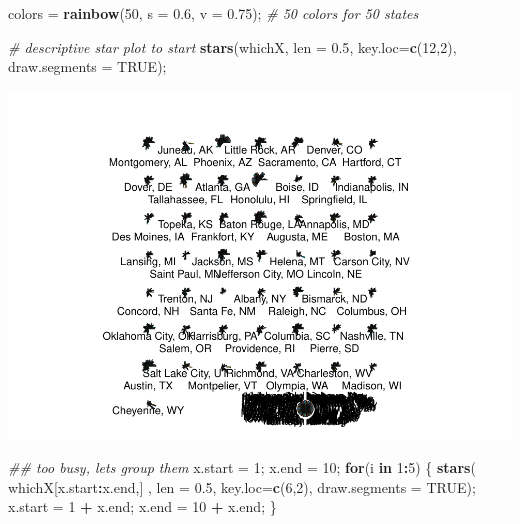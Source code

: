 \documentclass[
]{article}
\newenvironment{Shaded}{\begin{snugshade}}{\end{snugshade}}
\newcommand{\CommentTok}[1]{\textcolor[rgb]{0.56,0.35,0.01}{\textit{#1}}}
\newcommand{\ControlFlowTok}[1]{\textcolor[rgb]{0.13,0.29,0.53}{\textbf{#1}}}
\newcommand{\DataTypeTok}[1]{\textcolor[rgb]{0.13,0.29,0.53}{#1}}
\newcommand{\DecValTok}[1]{\textcolor[rgb]{0.00,0.00,0.81}{#1}}
\newcommand{\FloatTok}[1]{\textcolor[rgb]{0.00,0.00,0.81}{#1}}
\newcommand{\KeywordTok}[1]{\textcolor[rgb]{0.13,0.29,0.53}{\textbf{#1}}}
\newcommand{\NormalTok}[1]{#1}
\newcommand{\OperatorTok}[1]{\textcolor[rgb]{0.81,0.36,0.00}{\textbf{#1}}}
\newcommand{\OtherTok}[1]{\textcolor[rgb]{0.56,0.35,0.01}{#1}}
\newcommand{\StringTok}[1]{\textcolor[rgb]{0.31,0.60,0.02}{#1}}
\begin{document}
\begin{Shaded}
\begin{Highlighting}[]
\NormalTok{colors =}\StringTok{ }\KeywordTok{rainbow}\NormalTok{(}\DecValTok{50}\NormalTok{, }\DataTypeTok{s =} \FloatTok{0.6}\NormalTok{, }\DataTypeTok{v =} \FloatTok{0.75}\NormalTok{); }\CommentTok{\# 50 colors for 50 states}

\CommentTok{\# descriptive star plot to start}
\KeywordTok{stars}\NormalTok{(whichX, }\DataTypeTok{len =} \FloatTok{0.5}\NormalTok{, }\DataTypeTok{key.loc=}\KeywordTok{c}\NormalTok{(}\DecValTok{12}\NormalTok{,}\DecValTok{2}\NormalTok{), }\DataTypeTok{draw.segments =} \OtherTok{TRUE}\NormalTok{);}
\end{Highlighting}
\end{Shaded}

\includegraphics{graphics/chunk-distances-kmeans-setup-temp-1.pdf}

\begin{Shaded}
\begin{Highlighting}[]
\CommentTok{\#\# too busy, let\textquotesingle{}s group them}
\NormalTok{x.start =}\StringTok{ }\DecValTok{1}\NormalTok{;}
\NormalTok{x.end =}\StringTok{ }\DecValTok{10}\NormalTok{;}
\ControlFlowTok{for}\NormalTok{(i }\ControlFlowTok{in} \DecValTok{1}\OperatorTok{:}\DecValTok{5}\NormalTok{)}
\NormalTok{  \{}
  \KeywordTok{stars}\NormalTok{( whichX[x.start}\OperatorTok{:}\NormalTok{x.end,] , }
          \DataTypeTok{len =} \FloatTok{0.5}\NormalTok{, }\DataTypeTok{key.loc=}\KeywordTok{c}\NormalTok{(}\DecValTok{6}\NormalTok{,}\DecValTok{2}\NormalTok{), }\DataTypeTok{draw.segments =} \OtherTok{TRUE}\NormalTok{);}
\NormalTok{  x.start =}\StringTok{ }\DecValTok{1} \OperatorTok{+}\StringTok{ }\NormalTok{x.end;}
\NormalTok{  x.end =}\StringTok{ }\DecValTok{10} \OperatorTok{+}\StringTok{ }\NormalTok{x.end;}
\NormalTok{  \}}
\end{Highlighting}
\end{Shaded}
\end{document}
